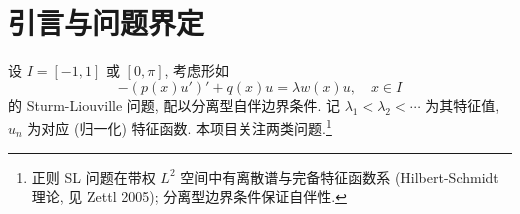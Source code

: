 \documentclass[UTF8]{ctexart}
\begin{document}
\begin{abstract}
本版 (2026-08-10, 会话 56) 更新: 缺口 (b) 阱族全 $R$ 相位刚性已严格证明 --- 对一切 $R>1$, 阱族 $\rho_{a,b}$ 的任意 sign-consistent good root 满足 $a+b=1$ (五步初等链: $\tau<2$ 经 $\alpha$-凸性, 残差消元, $r_\tau$ 精确结构含危险区引理与 $x+y>\pi$, $L_3$/跨区/$P$-和排除), 见 \texttt{SL\_gap\_n1\_well\_rigidity\_allR\_proof.pdf} (14 页零警告) 与总结 \texttt{SL\_gap\_n1\_well\_rigidity\_allR\_summary.pdf} (8 页零警告); 由此 INF 极值问题的一切内部临界点落在对称阱线上. INF 侧 $R>3/2$ 的完全闭合仍依赖对称线 1D 分析 ($R>3/2$ 段, 缺口 a$'$)、定理 A 独立复核 (c) 与全局 good-root 论证 (d), 暂不宣称闭合; 全部数值为 EVIDENCE 不构成证明.
本版 (2026-08-10, 会话 50) 更新: $n\ge2$ 相邻间距极端值的两项证明已集成 ---
(i) 有限块约化: 对每个 $R>1$、整数 $n\ge2$, $D_n=\lambda_{n+1}-\lambda_n$ 在完整
可测盒 $1\le\rho\le R$ 上同时达到最大/最小值, 每个全局极值子都 bang--bang 且至多
有 $2n$ 个开关 (至多 $2n+1$ 块); (ii) 精确 $2n$ 开关定理: 每个全局极值子合并相邻
同值块后恰有 $2n$ 个有效内部开关, 最大化子首尾块取 $1$、最小化子首尾块取 $R$
(对应会话 13 数值配置 $[1,R,\dots,1]$/$[R,1,\dots,R]$), 不假设对称或唯一. 证明见
\texttt{SL\_gap\_nge2\_finite\_reduction\_proof.pdf} 与
\texttt{SL\_gap\_nge2\_exact\_2n\_switches\_proof.pdf}; 数值审计全过;
未检索到直接等价已发表定理, 不声称首创.
本版 (2026-08-13, 会话 58 续作 8) 更新: $n\ge2$ 相邻间距极端值的边界生成排除 (G2) 已闭合 STRICT --- 在块能量恒等式 $K\equiv -2D<0$ (开关饱和, 会话 50 审计) 与精确零点计数 $\#Z(f;(0,1))=2n-2+\mathbf 1_{q_0>c}+\mathbf 1_{q_1<-c}$ (全部简单) 的基础上, Sturm 交错 + Cauchy 初值唯一性证明 $f$ 无内部二重点, 宽度塌缩极限论证排除首尾块边界生成, 故约化根不存在; 见 \texttt{SL\_gap\_nge2\_symmetry\_local\_proof.pdf} 2026-08-13 STRICT 增补与运行记录 R-20260812T090000Z-g1prime-g2. 反射对称性与唯一性 (iii)/(iv) 仍开放, 且仅依赖 (G1$'$) $\det K>0$ 的严格证明 (Sherman-Morrison 归约路线, R-202..R-204).
\end{abstract}

\tableofcontents

\section{引言与问题界定}

设 $I = [-1, 1]$ 或 $[0, \pi]$, 考虑形如
\begin{equation}
	-(p(x)u')' + q(x)u = \lambda w(x)u, \quad x \in I
\end{equation}
的 Sturm-Liouville 问题, 配以分离型自伴边界条件. 记 $\lambda_1 < \lambda_2 < \cdots$
为其特征值, $u_n$ 为对应 (归一化) 特征函数. 本项目关注两类问题.\footnote{正则 SL 问题在带权 $L^2$ 空间中有离散谱与完备特征函数系 (Hilbert-Schmidt 理论, 见 Zettl 2005); 分离型边界条件保证自伴性.}
\end{document}
